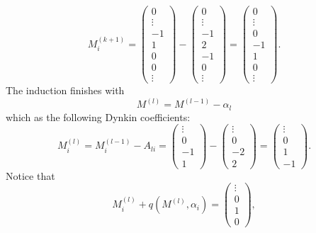 \begin{equation}
	M^{(k+1)}_i=
	\begin{pmatrix}
		0\\\vdots\\-1\\1\\0\\0\\\vdots
	\end{pmatrix}
	-
	\begin{pmatrix}
		0\\\vdots\\-1\\2\\-1\\0\\\vdots
	\end{pmatrix}
	=
	\begin{pmatrix}
		0\\\vdots\\0\\-1\\1\\0\\\vdots
	\end{pmatrix}.
\end{equation}
The induction finishes with
\begin{equation}
	M^{(l)}=M^{(l-1)}-\alpha_l
\end{equation}
which as the following Dynkin coefficients:
\begin{equation}
	M^{(l)}_i=M^{(l-1)}_i-A_{li}=
\begin{pmatrix}
\vdots\\0\\-1\\1
\end{pmatrix}
-
\begin{pmatrix}
\vdots\\0\\-2\\2
\end{pmatrix}
=
\begin{pmatrix}
\vdots\\0\\1\\-1
\end{pmatrix}.
\end{equation}
Notice that
\begin{equation}
	M^{(l)}_i+q(M^{(l)},\alpha_i)=
\begin{pmatrix}
\vdots\\0\\1\\0
\end{pmatrix},
\end{equation}
